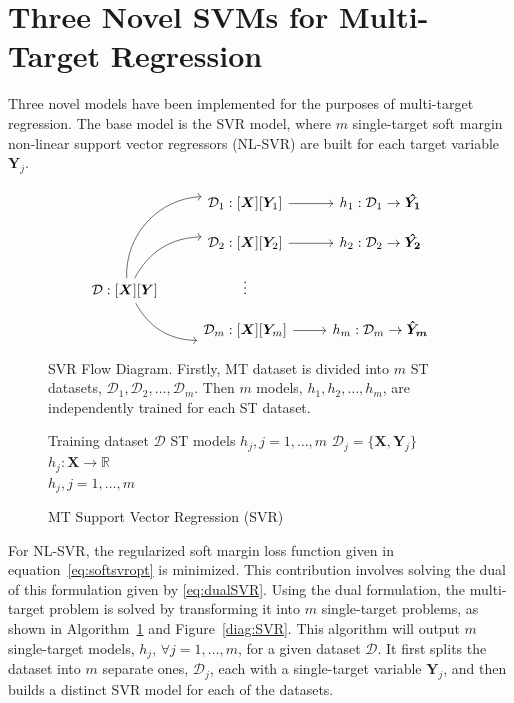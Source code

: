 \documentclass[reqno]{vcuthesis}
\numberwithin{equation}{chapter}
\begin{document}
\section{Three Novel SVMs for Multi-Target Regression}\label{sec:MTRproposal}
Three novel models have been implemented for the purposes of multi-target regression. The base model is the SVR model, where $m$ single-target soft margin non-linear support vector regressors (NL-SVR) are built for each target variable $\bm Y_j$. 
\begin{figure}[b!]
\begin{minipage}{0.9\textwidth}
\small \centering
\[\begin{tikzcd}[column sep = small, row sep = small]
& & \mathcal{D}_1 :  [\bm X][\bm Y_1]  \arrow[rr]  & & h_1 :  \mathcal{D}_1 \rightarrow \bm{\hat{Y_1}}\\
& & \mathcal{D}_2 :  [\bm X][\bm Y_2]  \arrow[rr] & & h_2 :  \mathcal{D}_2 \rightarrow \bm{\hat{Y_2}} \\        
\mathcal{D} :  [\bm X][\bm Y]  \arrow[uurr, bend left=45] \arrow[urr, bend left] \arrow[drr, bend right]  		& & \vdots \\
& & \mathcal{D}_m :  [\bm X][\bm Y_m] \arrow[rr] & & h_m :  \mathcal{D}_m \rightarrow \bm{\hat{Y}_m}
\end{tikzcd}\]
\end{minipage}
\caption{SVR Flow Diagram. Firstly, MT dataset is divided into $m$ ST datasets, $\mathcal{D}_1, \mathcal{D}_2, \ldots, \mathcal{D}_m$. Then $m$ models, $h_1, h_2, \ldots, h_m$, are independently trained for each ST dataset.}\label{diag:SVR}
\begin{algorithm}[H]
\caption{MT Support Vector Regression (SVR)} \label{alg:SVR} 
\small \centering
\begin{algorithmic}[1]
\renewcommand{\algorithmicrequire}{\textbf{Input:}}
\renewcommand{\algorithmicensure}{\textbf{Output:}}
\Require Training dataset $\mathcal{D}$
\Ensure  ST models $h_j, j = 1,\ldots,m$
\State $\mathcal{D}_j = \{\bm X, \bm Y_j\}$ 
\State $h_j : \bm X \rightarrow \mathbb{R}$ 
\EndFor \\
\Return $h_j, j=1,\ldots,m$ 
\end{algorithmic} 
\end{algorithm}
\end{figure}

For NL-SVR, the regularized soft margin loss function given in equation~\eqref{eq:softsvropt} is minimized. This contribution involves solving the dual of this formulation given by \eqref{eq:dualSVR}. Using the dual formulation, the multi-target problem is solved by transforming it into $m$ single-target problems, as shown in Algorithm~\ref{alg:SVR} and Figure~\ref{diag:SVR}. This algorithm will output $m$ single-target models, $h_j,\,\forall j = 1,\ldots,m$, for a given dataset $\mathcal{D}$. It first splits the dataset into $m$ separate ones, $\mathcal{D}_j$, each with a single-target variable $\bm Y_j$, and then builds a distinct SVR model for each of the datasets. 
\end{document}
